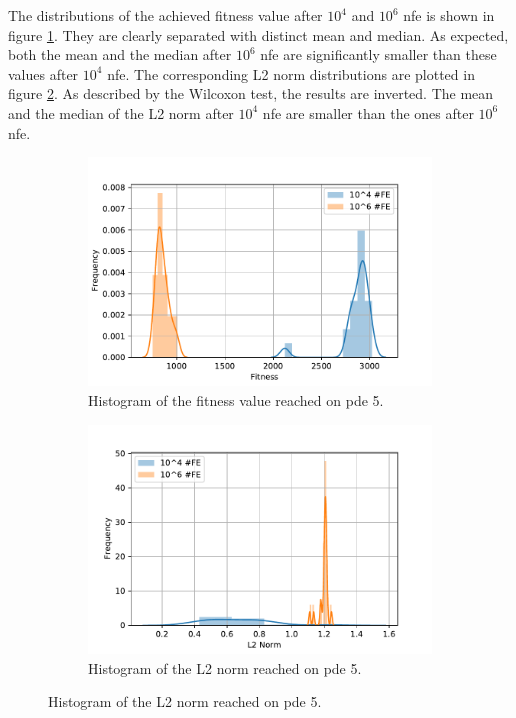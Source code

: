 \documentclass[./\jobname.tex]{subfiles}
\begin{document}
The distributions of the achieved fitness value after $10^4$ and $10^6$ \gls{nfe} is shown in figure \ref{fig:pde5_fitness_histogram}. They are clearly separated with distinct mean and median. As expected, both the mean and the median after $10^6$ \gls{nfe} are significantly smaller than these values after $10^4$ \gls{nfe}. The corresponding L2 norm distributions are plotted in figure \ref{fig:pde5_norm_histogram}. As described by the Wilcoxon test, the results are inverted. The mean and the median of the L2 norm after $10^4$ \gls{nfe} are smaller than the ones after $10^6$ \gls{nfe}.
\begin{figure}[h]
	\centering
	\begin{subfigure}[b]{0.5\linewidth}
		\centering
		\includegraphics[width=1\textwidth]{../../code/experiments/experiment_0/pde5_fit_histogram.pdf}
		\caption{Histogram of the fitness value reached on \gls{pde} 5.}
		\label{fig:pde5_fitness_histogram}
	\end{subfigure}%
	\begin{subfigure}[b]{0.5\linewidth}
		\centering
		\includegraphics[width=1\textwidth]{../../code/experiments/experiment_0/pde5_norm_histogram.pdf}
		\caption{Histogram of the L2 norm reached on \gls{pde} 5.}
		\label{fig:pde5_norm_histogram}
	\end{subfigure}%
	\label{fig:pde5_histograms}
\end{figure}
\end{document}
